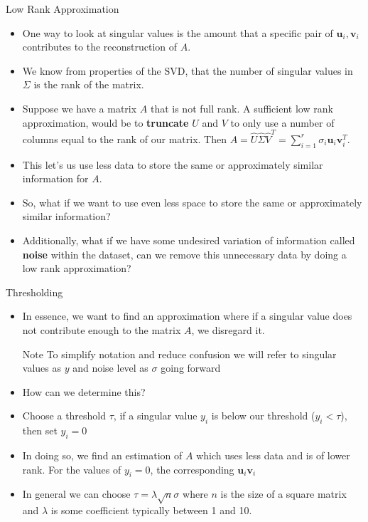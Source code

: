 \documentclass[aspectratio=169,xcolor=dvipsnames]{beamer}
\renewcommand{\vec}[1]{\mathbf{#1}}
\begin{document}
	
	\begin{frame}{Low Rank Approximation}
		\begin{itemize}
			\item One way to look at singular values is the amount that a specific pair of $\vec{u}_i, \vec{v}_i$ contributes to the reconstruction of $A$.
			\item We know from properties of the SVD, that the number of singular values in $\Sigma$ is the rank of the matrix.
			\item Suppose we have a matrix $A$ that is not full rank. A sufficient low rank approximation, would be to \textbf{truncate} $U$ and $V$ to only use a number of columns equal to the rank of our matrix. Then $A = \hat{U}\hat{\Sigma}\hat{V}^T = \sum_{i=1}^{r} \sigma_i\vec{u}_i\vec{v}_i^T$. 
			\item This let's us use less data to store the same or approximately similar information for $A$.
			\item So, what if we want to use even less space to store the same or approximately similar information?
			\item Additionally, what if we have some undesired variation of information called \textbf{noise} within the dataset, can we remove this unnecessary data by doing a low rank approximation?
		\end{itemize}
	\end{frame}
	
	\begin{frame}{Thresholding}
		\begin{itemize}
			\item In essence, we want to find an approximation where if a singular value does not contribute enough to the matrix $A$, we disregard it.
	\begin{block}{Note}
		To simplify notation and reduce confusion we will refer to singular values as $y$ and noise level as $\sigma$ going forward
	\end{block}
			\item How can we determine this?
			\item Choose a threshold $\tau$, if a singular value $y_i$ is below our threshold ($y_i < \tau$), then set $y_i=0$
			\item In doing so, we find an estimation of $A$ which uses less data and is of lower rank. For the values of $y_i = 0$, the corresponding $\vec{u}_i\vec{v}_i$
			\item In general we can choose $\tau = \lambda\sqrt{n}\sigma$\cite{Chatterjee2015} where $n$ is the size of a square matrix and $\lambda$ is some coefficient typically between 1 and 10.
		\end{itemize}
	\end{frame}
	
\end{document}
